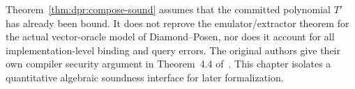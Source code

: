 \begin{remark}
Theorem~\ref{thm:dpr:compose-sound}
assumes that the committed
polynomial $T'$ has already been
bound. It does not reprove the
emulator/extractor theorem
for the actual vector-oracle
model of Diamond--Posen,
nor does it account for
all implementation-level
binding and query errors.
The original authors give
their own compiler security
argument in Theorem~4.4
of~\cite{DiamondPosen2024}.
This chapter isolates
a quantitative algebraic
soundness interface for
later formalization.
\end{remark}
